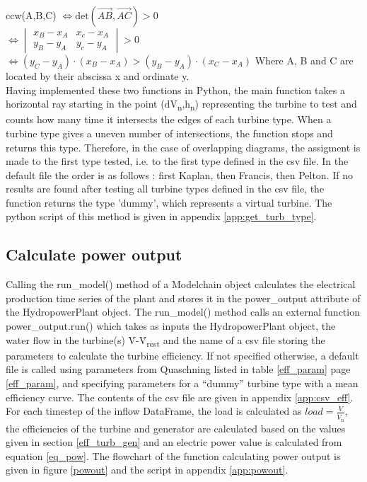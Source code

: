 ccw(A,B,C) \tabto{2.5cm}$\iff \mathrm{det}(\overrightarrow{AB},\overrightarrow{AC})>0$\newline \\
\tabto{2.5cm}$\iff \begin{vmatrix}x_B-x_A&x_c-x_A\\y_B-y_A&y_c-y_A\end{vmatrix}>0$\newline\\
\tabto{2.5cm}$\iff (y_C-y_A)\cdot(x_B-x_A) > (y_B-y_A)\cdot(x_C-x_A)$ \newline
Where A, B and C are located by their abscissa x and ordinate y. \newline
\\
Having implemented these two functions in Python, the main function takes a horizontal ray starting in the point (dV\textsubscript{n},h\textsubscript{n}) representing the turbine to test and counts how many time it intersects the edges of each turbine type. When a turbine type gives a uneven number of intersections, the function stops and returns this type. Therefore, in the case of overlapping diagrams, the assigment is made to the first type tested, i.e. to the first type defined in the csv file. In the default file the order is as follows : first Kaplan, then Francis, then Pelton. If no results are found after testing all turbine types defined in the csv file, the function returns the type 'dummy', which represents a virtual turbine. The python script of this method is given in appendix \ref{app:get_turb_type}.

\subsection{Calculate power output}

Calling the run{\_}model() method of a Modelchain object calculates the electrical production time series of the plant and stores it in the power{\_}output attribute of the HydropowerPlant object. The run{\_}model() method calls an external function power{\_}output.run() which takes as inputs the HydropowerPlant object, the water flow in the turbine(s) \.{V}-\.{V}\textsubscript{rest} and the name of a csv file storing the parameters to calculate the turbine efficiency. If not specified otherwise, a default file is called using parameters from Quaschning \cite{quaschning} listed in table \ref{eff_param} page \ref{eff_param}, and specifying parameters for a ``dummy'' turbine type with a mean efficiency curve. The contents of the csv file are given in appendix \ref{app:csv_eff}. \newline
For each timestep of the inflow DataFrame, the load is calculated as $load = \frac{\dot{V}}{\dot{V}_\mathrm{n}}$, the efficiencies of the turbine and generator are calculated based on the values given in section \ref{eff_turb_gen} and an electric power value is calculated from equation \ref{eq_pow}. The flowchart of the function calculating power output is given in figure \ref{powout} and the script in appendix \ref{app:powout}.

